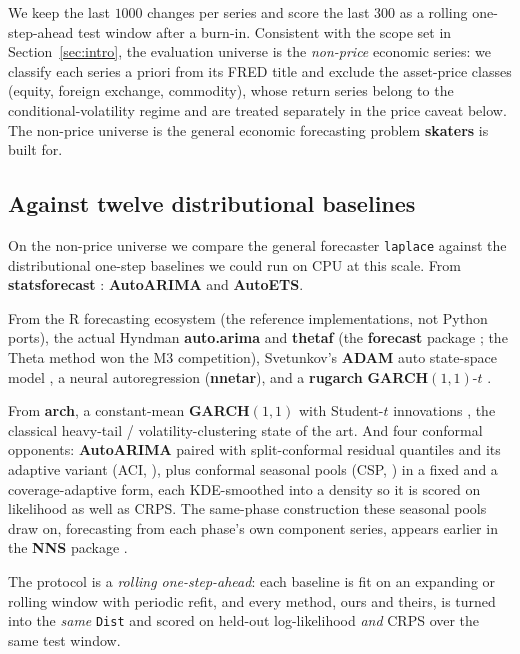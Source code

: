 \documentclass[article]{jss}
\providecommand{\proglang}[1]{\textsf{#1}}
\providecommand{\pkg}[1]{\textbf{#1}}
\providecommand{\code}[1]{\texttt{#1}}
\begin{document}
We keep the last $1000$ changes per series and score the last $300$ as a
rolling one-step-ahead test window after a burn-in. Consistent with the scope set
in Section~\ref{sec:intro}, the evaluation universe is the \emph{non-price}
economic series: we classify each series a priori from its FRED title and exclude
the asset-price classes (equity, foreign exchange, commodity), whose return
series belong to the conditional-volatility regime and are treated separately in
the price caveat below. The non-price universe is the general economic forecasting
problem \pkg{skaters} is built for.

\subsection{Against twelve distributional baselines} \label{sec:sota}

On the non-price universe we compare the general forecaster \code{laplace}
against the distributional one-step baselines we could run on CPU at this
scale. From
\pkg{statsforecast} \citep{garza2022statsforecast}: \pkg{AutoARIMA} and
\pkg{AutoETS}.

From the \proglang{R} forecasting ecosystem (the reference
implementations, not Python ports), the actual Hyndman \pkg{auto.arima} and
\pkg{thetaf} (the \pkg{forecast} package \citep{hyndman2008automatic}; the Theta
method \citep{assimakopoulos2000theta} won the M3 competition), Svetunkov's
\pkg{ADAM} auto state-space model \citep{svetunkov2023adam}, a neural
autoregression (\pkg{nnetar}), and a \pkg{rugarch} \pkg{GARCH}$(1,1)$-$t$
\citep{ghalanos2022rugarch}.

From \pkg{arch}, a constant-mean \pkg{GARCH}$(1,1)$
with Student-$t$ innovations
\citep{bollerslev1986generalized,bollerslev1987conditionally}, the classical
heavy-tail / volatility-clustering state of the art. And four conformal opponents:
\pkg{AutoARIMA} paired with split-conformal residual quantiles
\citep{vovk2019conformal} and its adaptive variant (ACI,
\citealp{gibbs2021adaptive}), plus conformal seasonal pools (CSP,
\citealp{manokhin2026csp}) in a fixed and a coverage-adaptive form, each
KDE-smoothed into a density so it is scored on likelihood as well as CRPS.
The same-phase construction these seasonal pools draw on, forecasting from
each phase's own component series, appears earlier in the \pkg{NNS} package
\citep{viole2026nns}.

The protocol is a \emph{rolling one-step-ahead}: each baseline is fit on an
expanding or rolling window with periodic refit, and every method, ours and
theirs, is turned into the \emph{same} \code{Dist} and scored on held-out
log-likelihood \emph{and} CRPS over the same test window.
\end{document}
